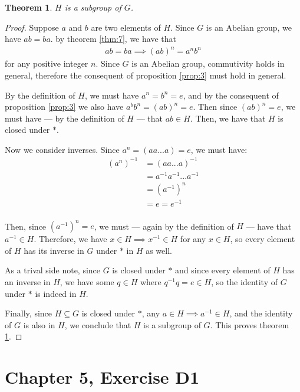 \documentclass[12pt]{article}
\newtheorem{thm}{Theorem}
\begin{document}
\begin{thm} \label{thm:9}
	$H$ is a subgroup of $G$.
\end{thm}

\begin{proof}
	Suppose $a$ and $b$ are two elements of $H$.
	Since $G$ is an Abelian group, we have $ab = ba$.
	by theorem \ref{thm:7},
	we have that 
	\begin{align} \label{prop:3}
		ab = ba \implies (ab)^n = a^n b^n
	\end{align}
	for any positive integer $n$.
	Since $G$ is an Abelian group,
	commutivity holds in general,
	therefore the consequent of proposition \ref{prop:3}
	must hold in general.
	
	By the definition of $H$,
	we must have $a^n = b^n = e$,
	and by the consequent of proposition \ref{prop:3}
	we also have $a^b b^n = (ab)^n = e$.
	Then since $(ab)^n = e$,
	we must have
	--- by the definition of $H$ ---
	that $ab \in H$.
	Then, we have that $H$ is closed under $*$.

	Now we consider inverses.
	Since $a^n = (aa ... a) = e$,
	we must have:
	\begin{align}
		(a^n)^{-1} & = (aa ... a)^{-1} \\
			   & = a^{-1} a^{-1} ... a^{-1}  \\
			   & = (a^{-1})^n \\
			   & = e = e^{-1} \\
	\end{align}

	Then, since $(a^{-1})^n = e$,
	we must
	--- again by the definition of $H$ ---
	have that $a^{-1} \in H$.
	Therefore, we have $x \in H \implies x^{-1} \in H$
	for any $x \in H$,
	so every element of $H$ has its inverse in $G$ under $*$ in $H$ as well.

	As a trival side note, since $G$ is closed under $*$
	and since every element of $H$ has an inverse in $H$,
	we have some $q \in H$ where $q^{-1} q = e \in H$,
	so the identity of $G$ under $*$ is indeed in $H$.

	Finally, since $H \subseteq G$ is closed under $*$,
	any $a \in H \implies a^{-1} \in H$,
	and the identity of $G$ is also in $H$,
	we conclude that $H$ is a subgroup of $G$.
	This proves theorem \ref{thm:9}.
\end{proof}

\section{Chapter 5, Exercise D1}
\end{document}
